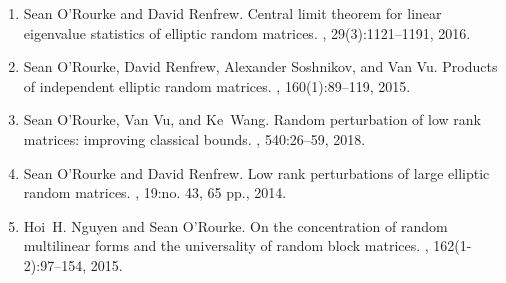 \documentclass[letterpaper]{article}
\begin{document}
\begin{enumerate}
	\item Sean O'Rourke and David Renfrew.
	\newblock Central limit theorem for linear eigenvalue statistics of elliptic random matrices.
	, 29(3):1121--1191, 2016.
	\item Sean O'Rourke, David Renfrew, Alexander Soshnikov, and Van Vu.
	\newblock Products of independent elliptic random matrices.
	, 160(1):89--119, 2015.
	\item Sean O'Rourke, Van Vu, and Ke~Wang.
	\newblock Random perturbation of low rank matrices: improving classical bounds.
	, 540:26--59, 2018.
	\item Sean O'Rourke and David Renfrew.
	\newblock Low rank perturbations of large elliptic random matrices.
	, 19:no. 43, 65 pp., 2014.
	\item Hoi~H. Nguyen and Sean O'Rourke.
	\newblock On the concentration of random multilinear forms and the universality of random block matrices.
	, 162(1-2):97--154, 2015.

\end{enumerate}
\end{document}
